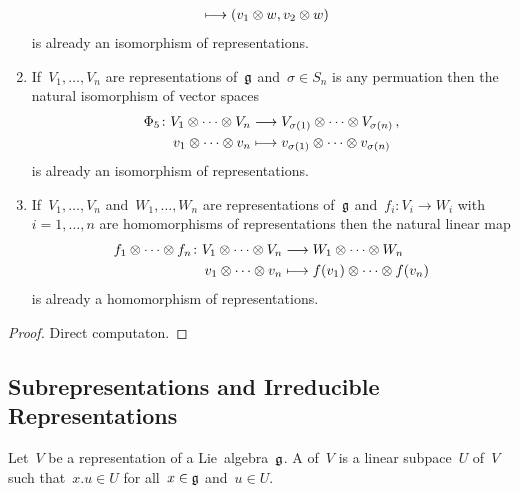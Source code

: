 \begin{proposition}
\begin{enumerate}
\begin{align*}
        &\longmapsto
        (v_1 \otimes w, v_2 \otimes w)
      \end{align*}
      is already an isomorphism of representations.
    \item
      If~$V_1, \dotsc, V_n$ are representations of~$\mathfrak{g}$ and~$\sigma \in S_n$ is any permuation then the natural isomorphism of vector spaces
      \begin{align*}
        \Phi_5
        \colon 
        V_1 \otimes \dotsb \otimes V_n
        &\longrightarrow
        V_{\sigma(1)} \otimes \dotsb \otimes V_{\sigma(n)} \,,
        \\
        v_1 \otimes \dotsb \otimes v_n
        &\longmapsto
        v_{\sigma(1)} \otimes \dotsb \otimes v_{\sigma(n)}
      \end{align*}
      is already an isomorphism of representations.
    \item
      If~$V_1, \dotsc, V_n$ and~$W_1, \dotsc, W_n$ are representations of~$\mathfrak{g}$ and~$f_i \colon V_i \to W_i$ with~$i = 1, \dotsc, n$ are homomorphisms of representations then the natural linear map
      \begin{align*}
        f_1 \otimes \dotsb \otimes f_n
        \colon
        V_1 \otimes \dotsb \otimes V_n
        &\longrightarrow
        W_1 \otimes \dotsb \otimes W_n
        \\
        v_1 \otimes \dotsb \otimes v_n
        &\longmapsto
        f(v_1) \otimes \dotsb \otimes f(v_n)
      \end{align*}
      is already a homomorphism of representations.
  \end{enumerate}
\end{proposition}


\begin{proof}
  Direct computaton.
\end{proof} 





\subsection{Subrepresentations and Irreducible Representations}


\begin{definition}
  Let~$V$ be a representation of a Lie~algebra~$\mathfrak{g}$.
  A  of~$V$ is a linear subpace~$U$ of~$V$ such that~$x.u \in U$ for all~$x \in \mathfrak{g}$ and~$u \in U$.
\end{definition}

